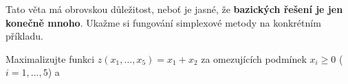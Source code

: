 Tato věta má obrovskou důležitost, neboť je jasné, že {\bf bazických řešení je jen konečně mnoho}.
Ukažme si fungování simplexové metody na konkrétním příkladu.
\begin{priklad}
Maximalizujte funkci $z(x_1,\dots,x_5) = x_1+x_2$ za omezujících podmínek $x_i\geq 0$ ($i=1,\dots, 5$) a
\begin{center}
\end{center}
\end{priklad}

